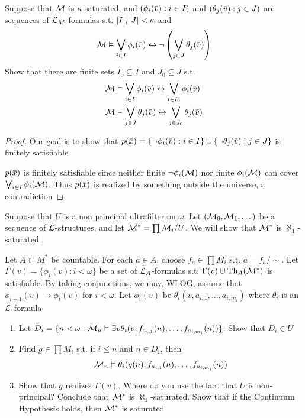 \documentclass[11pt]{article}
\begin{document}
\begin{exercise}
\label{ex4.5.34}
Suppose that \(\mathcal{M}\) is \(\kappa\)-saturated, and \((\phi_i(\barv):i\in I)\) and \((\theta_j(\barv):j\in J)\) are
sequences of \(\mathcal{L}_M\)-formulas s.t. \(\abs{I},\abs{J}<\kappa\) and
\begin{equation*}
\calm\vDash\bigvee_{i\in I}\phi_i(\barv)\leftrightarrow\neg\left( \bigvee_{j\in J}\theta_j(\barv) \right)
\end{equation*}
Show that there are finite sets \(I_0\subseteq I\) and \(J_0\subseteq J\) s.t.
\begin{align*}
&\calm\vDash\bigvee_{i\in I}\phi_i(\barv)\leftrightarrow\bigvee_{i\in I_0}\phi_i(\barv)\\
&\calm\vDash\bigvee_{j\in J}\theta_j(\barv)\leftrightarrow\bigvee_{j\in J_0}\theta_j(\barv)
\end{align*}
\end{exercise}

\begin{proof}
Our goal is to show that \(p(\barx)=\{\neg\phi_i(\barv):i\in I\}\cup\{\neg\theta_j(\barv):j\in J\}\) is finitely
satisfiable

\(p(\barx)\) is finitely satisfiable since neither finite \(\neg\phi_i(\mathcal{M})\) nor finite \(\phi_i(\mathcal{M})\) can
cover \(\bigvee_{i\in I}\phi_i(\mathcal{M})\). Thus \(p(\barx)\) is realized by something outside the universe, a contradiction
\end{proof}

\begin{exercise}
Suppose that \(U\) is a non principal ultrafilter on \(\omega\). Let \((\mathcal{M}_0,\mathcal{M}_1,\dots)\) be a sequence
of \(\mathcal{L}\)-structures, and let \(\mathcal{M}^*=\prod\mathcal{M}_i/U\). We will show that \(\mathcal{M}^*\) is \(\aleph_1\)-saturated

Let \(A\subset M^*\) be countable. For each \(a\in A\), choose \(f_a\in\prod M_i\) s.t. \(a=f_a/\sim\).
Let \(\Gamma(v)=\{\phi_i(v):i<\omega\}\) be a set of \(\mathcal{L}_A\)-formulas s.t. \(\Gamma(v)\cup\operatorname{Th}_A(\mathcal{M}^*)\) is satisfiable.
By taking conjunctions, we may, WLOG, assume that \(\phi_{i+1}(v)\to\phi_i(v)\) for \(i<\omega\).
Let \(\phi_i(v)\) be \(\theta_i(v,a_{i,1},\dots,a_{i,m_i})\) where \(\theta_i\) is an \(\mathcal{L}\)-formula
\begin{enumerate}
\item Let \(D_i=\{n<\omega:\mathcal{M}_n\vDash\exists v\theta_i(v,f_{a_{i,1}}(n),\dots,f_{a_{i,m_i}}(n))\}\). Show that \(D_i\in U\)
\item Find \(g\in\prod M_i\) s.t. if \(i\le n\) and \(n\in D_i\), then
\begin{equation*}
\mathcal{M}_n\vDash\theta_i(g(n),f_{a_{i,1}}(n),\dots,f_{a_{i,m_i}}(n))
\end{equation*}
\item Show that \(g\) realizes \(\Gamma(v)\). Where do you use the fact that \(U\) is non-principal?
Conclude that \(\mathcal{M}^*\) is \(\aleph_1\)-saturated. Show that if the Continuum Hypothesis holds,
then \(\mathcal{M}^*\) is saturated
\end{enumerate}
\end{exercise}
\end{document}
